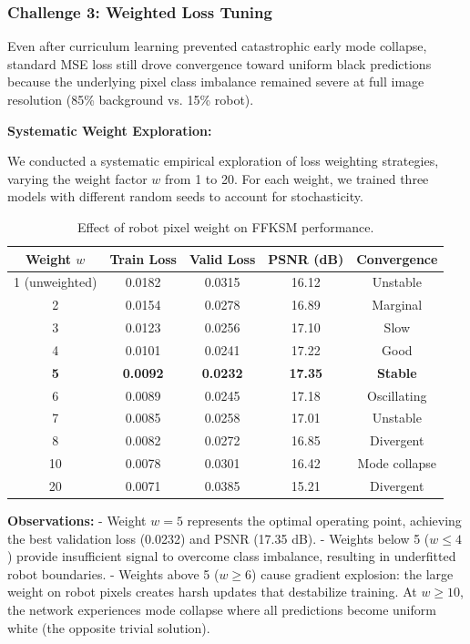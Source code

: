 \documentclass[12pt,a4paper,oneside]{report}
\begin{document}
\subsubsection{Challenge 3: Weighted Loss Tuning}

Even after curriculum learning prevented catastrophic early mode collapse, standard MSE loss still drove convergence toward uniform black predictions because the underlying pixel class imbalance remained severe at full image resolution (85\% background vs. 15\% robot).

\textbf{Systematic Weight Exploration:}

We conducted a systematic empirical exploration of loss weighting strategies, varying the weight factor $w$ from 1 to 20. For each weight, we trained three models with different random seeds to account for stochasticity.

\begin{table}[H]
\centering
\caption{Effect of robot pixel weight on FFKSM performance.}
\label{tab:weight_tuning}
\begin{tabular}{ccccc}
\toprule
Weight $w$ & Train Loss & Valid Loss & PSNR (dB) & Convergence \\
\midrule
1 (unweighted) & 0.0182 & 0.0315 & 16.12 & Unstable \\
2 & 0.0154 & 0.0278 & 16.89 & Marginal \\
3 & 0.0123 & 0.0256 & 17.10 & Slow \\
4 & 0.0101 & 0.0241 & 17.22 & Good \\
\textbf{5} & \textbf{0.0092} & \textbf{0.0232} & \textbf{17.35} & \textbf{Stable} \\
6 & 0.0089 & 0.0245 & 17.18 & Oscillating \\
7 & 0.0085 & 0.0258 & 17.01 & Unstable \\
8 & 0.0082 & 0.0272 & 16.85 & Divergent \\
10 & 0.0078 & 0.0301 & 16.42 & Mode collapse \\
20 & 0.0071 & 0.0385 & 15.21 & Divergent \\
\bottomrule
\end{tabular}
\end{table}

\textbf{Observations:}
- Weight $w = 5$ represents the optimal operating point, achieving the best validation loss (0.0232) and PSNR (17.35 dB).
- Weights below 5 ($w \leq 4$) provide insufficient signal to overcome class imbalance, resulting in underfitted robot boundaries.
- Weights above 5 ($w \geq 6$) cause gradient explosion: the large weight on robot pixels creates harsh updates that destabilize training. At $w \geq 10$, the network experiences mode collapse where all predictions become uniform white (the opposite trivial solution).
\end{document}
